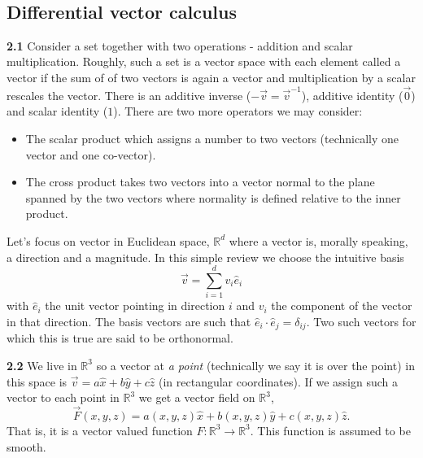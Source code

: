 \documentclass[11pt]{article}
\providecommand{\tightlist}{%
      \setlength{\itemsep}{0pt}\setlength{\parskip}{0pt}}
\begin{document}
    \begin{center}
    \end{center}
    { \hspace*{\fill} \\}
    
    \hypertarget{differential-vector-calculus}{%
\subsection{Differential vector
calculus}\label{differential-vector-calculus}}

\textbf{2.1} Consider a set together with two operations - addition and
scalar multiplication. Roughly, such a set is a vector space with each
element called a vector if the sum of of two vectors is again a vector
and multiplication by a scalar rescales the vector. There is an additive
inverse (\(-\vec v=\vec v^{-1}\)), additive identity (\(\vec 0\)) and
scalar identity (\(1\)). There are two more operators we may consider:

\begin{itemize}
\tightlist
\item
  The scalar product which assigns a number to two vectors (technically
  one vector and one co-vector).
\item
  The cross product takes two vectors into a vector normal to the plane
  spanned by the two vectors where normality is defined relative to the
  inner product.
\end{itemize}

Let's focus on vector in Euclidean space, \(\mathbb{R}^d\) where a
vector is, morally speaking, a direction and a magnitude. In this simple
review we choose the intuitive basis \[
\vec v =\sum_{i=1}^dv_i\hat e_i
\] with \(\hat e_i\) the unit vector pointing in direction \(i\) and
\(v_i\) the component of the vector in that direction. The basis vectors
are such that \(\hat e_i\cdot \hat e_j = \delta_{ij}\). Two such vectors
for which this is true are said to be orthonormal.

\textbf{2.2} We live in \(\mathbb R^3\) so a vector at \emph{a point}
(technically we say it is over the point) in this space is
\(\vec v = a \hat x+ b\hat y+c \hat z\) (in rectangular coordinates). If
we assign such a vector to each point in \(\mathbb R^3\) we get a vector
field on \(\mathbb R^3\), \[
\vec F(x,y,z) = a(x,y,z)\hat x+b(x,y,z)\hat y+c(x,y,z)\hat z.
\] That is, it is a vector valued function
\(F:\mathbb R^3\to \mathbb R^3\). This function is assumed to be smooth.
\end{document}
